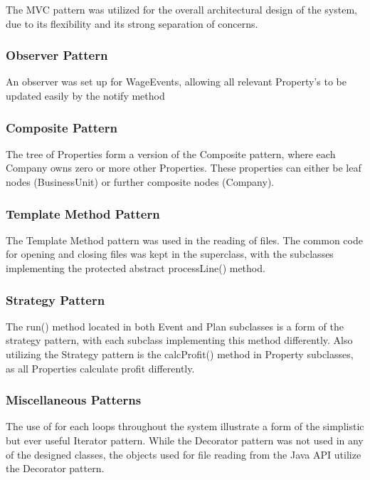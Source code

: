 \documentclass[]{article}
\begin{document}
The MVC pattern was utilized for the overall architectural design of the system, due to its flexibility and its strong separation of concerns.

\subsubsection*{Observer Pattern}

An observer was set up for WageEvents, allowing all relevant Property's to be updated easily by the notify method

\subsubsection*{Composite Pattern}

The tree of Properties form a version of the Composite pattern, where each Company owns zero or more other Properties. These properties can either be leaf nodes (BusinessUnit) or further composite nodes (Company).


\subsubsection*{Template Method Pattern}

The Template Method pattern was used in the reading of files. The common code for opening and closing files was kept in the superclass, with the subclasses implementing the protected abstract processLine() method.

\subsubsection*{Strategy Pattern}

The run() method located in both Event and Plan subclasses is a form of the strategy pattern, with each subclass implementing this method differently. Also utilizing the Strategy pattern is the calcProfit() method in Property subclasses, as all Properties calculate profit differently.

\subsubsection*{Miscellaneous Patterns}

The use of for each loops throughout the system illustrate a form of the simplistic but ever useful Iterator pattern. While the Decorator pattern was not used in any of the designed classes, the objects used for file reading from the Java API utilize the Decorator pattern.
\end{document}
